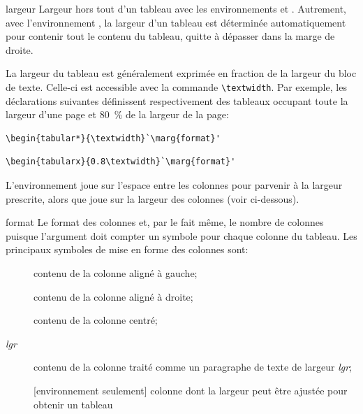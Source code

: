 \begin{list}{}{%
    \setlength{\labelsep}{1.5ex}
    \setlength{\leftmargin}{\labelwidth}
    \addtolength{\leftmargin}{\labelsep}
    \setlength{\parsep}{0.5ex plus0.2ex minus0.2ex}
    \setlength{\itemsep}{0.3ex}
    \renewcommand{\makelabel}[1]{\meta{#1}\hfill}}
%
\item[largeur] Largeur hors tout d'un tableau avec les
  environnements  et . Autrement,
  avec l'environnement , la largeur d'un tableau est
  déterminée automatiquement pour contenir tout le contenu du tableau,
  quitte à dépasser dans la marge de droite.

  La largeur du tableau est généralement exprimée en fraction de la
  largeur du bloc de texte. Celle-ci est accessible avec la commande
  \verb=\textwidth=. Par exemple, les déclarations suivantes
  définissent respectivement des tableaux occupant toute la largeur
  d'une page et 80~\% de la largeur de la page:
\begin{lstlisting}
\begin{tabular*}{\textwidth}`\marg{format}'
\end{lstlisting}
\begin{lstlisting}
\begin{tabularx}{0.8\textwidth}`\marg{format}'
\end{lstlisting}
  L'environnement  joue sur l'espace entre les colonnes
  pour parvenir à la largeur prescrite, alors que  joue
  sur la largeur des colonnes (voir ci-dessous).
\item[format] Le format des colonnes et, par le fait même, le nombre
  de colonnes puisque l'argument doit compter un symbole pour chaque
  colonne du tableau. Les principaux symboles de mise en forme des
  colonnes sont:
  \begin{description}
  \item[\normalfont{}] contenu de la colonne aligné à gauche;
  \item[\normalfont{}] contenu de la colonne aligné à droite;
  \item[\normalfont{}] contenu de la colonne centré;
  \item[\normalfont{}\textit{lgr}\code{\}}] contenu de la colonne traité comme un
    paragraphe de texte de largeur \textit{lgr};
  \item[\normalfont{}] [environnement  seulement]
    colonne dont la largeur peut être ajustée pour obtenir un tableau

\end{description}
\end{list}
